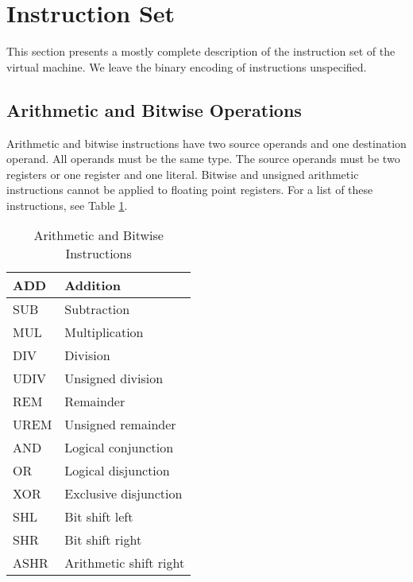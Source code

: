 \section{Instruction Set}

This section presents a mostly complete description
of the instruction set of the virtual machine.
We leave the binary encoding of instructions unspecified.

\subsection{Arithmetic and Bitwise Operations}

Arithmetic and bitwise instructions have two source operands and
one destination operand. All operands must be the same type.
The source operands must be two registers or one register and one literal.
Bitwise and unsigned arithmetic instructions cannot be applied to
floating point registers. For a list of these instructions,
see Table \ref{ArithmeticAndBitwiseInstructions}.

\begin{table}[h!]
  \begin{center}
    \begin{tabular}{|l|l|}
      \hline
      ADD  & Addition               \\ \hline
      SUB  & Subtraction            \\ \hline
      MUL  & Multiplication         \\ \hline
      DIV  & Division               \\ \hline
      UDIV & Unsigned division      \\ \hline
      REM  & Remainder              \\ \hline
      UREM & Unsigned remainder     \\ \hline
      AND  & Logical conjunction     \\ \hline
      OR   & Logical disjunction    \\ \hline
      XOR  & Exclusive disjunction  \\ \hline
      SHL  & Bit shift left         \\ \hline
      SHR  & Bit shift right        \\ \hline
      ASHR & Arithmetic shift right \\ \hline
    \end{tabular}
  \end{center}
  \caption{Arithmetic and Bitwise Instructions}
  \label{ArithmeticAndBitwiseInstructions}
\end{table}

